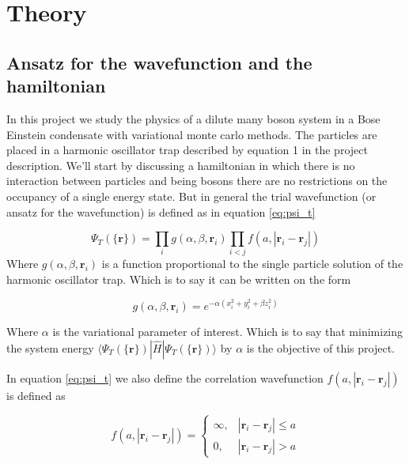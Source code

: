 \section{Theory}

\subsection{Ansatz for the wavefunction and the hamiltonian}

In this project we study the physics of a dilute many boson system in a Bose Einstein condensate with variational monte carlo methods. The particles are placed in a harmonic oscillator trap described by equation 1 in the project description. We'll start by discussing a hamiltonian in which there is no interaction between particles and being bosons there are no restrictions on the occupancy of a single energy state. But in general the trial wavefunction (or ansatz for the wavefunction) is defined as in equation \ref{eq:psi_t}

\begin{equation}\label{eq:psi_t}
\Psi_T(\{\mathbf{r}\}) = \prod _i g(\alpha, \beta, \mathbf{r}_i) \prod _{i <j} f(a, |\mathbf{r}_i -\mathbf{r}_j|)
\end{equation} 
\noindent Where $g(\alpha, \beta, \mathbf{r}_i)$ is a function proportional to the single particle solution of the harmonic oscillator trap. Which is to say it can be written on the form 

\begin{equation}
g(\alpha, \beta, \mathbf{r}_i) = e^{-\alpha ( x_i^2+ y_i^2 + \beta z_i ^2)}
\end{equation}


\noindent Where $\alpha$ is the variational parameter of interest. Which is to say that minimizing the system energy $\langle \Psi_T(\{\mathbf{r}\}) | \hat{H} |\Psi_T(\{\mathbf{r}\}) \rangle$ by $\alpha$ is the objective of this project. 

In equation \ref{eq:psi_t} we also define the correlation wavefunction $f(a, |\mathbf{r}_i -\mathbf{r}_j|)$ is  defined as 

\begin{equation}
f(a, |\mathbf{r}_i -\mathbf{r}_j|) = 
\begin{cases}
\infty, & |\mathbf{r}_i -\mathbf{r}_j| \leq a \\
0, & |\mathbf{r}_i -\mathbf{r}_j| > a
\end{cases}
\end{equation}

